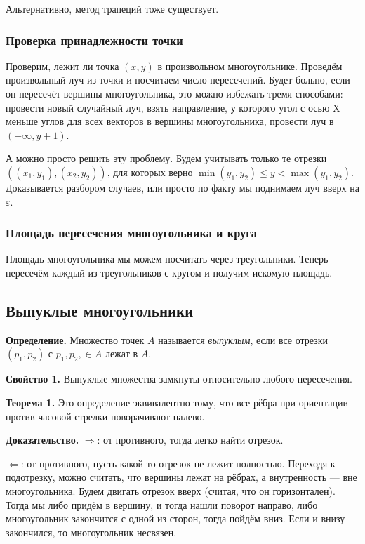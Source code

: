 Альтернативно, метод трапеций тоже существует.

\subsubsection{Проверка принадлежности точки}
Проверим, лежит ли точка $(x, y)$ в произвольном многоугольнике.
Проведём произвольный луч из точки и посчитаем число пересечений.
Будет больно, если он пересечёт вершины многоугольника, это можно избежать тремя способами: провести новый случайный луч, взять направление, у которого угол с осью X меньше углов для всех векторов в вершины многоугольника, провести луч в $(+\infty, y + 1)$.

А можно просто решить эту проблему. Будем учитывать только те отрезки $((x_1, y_1), (x_2, y_2))$, для которых верно $\min(y_1, y_2) \le y < \max(y_1, y_2)$.
Доказывается разбором случаев, или просто по факту мы поднимаем луч вверх на $\varepsilon$.

\subsubsection{Площадь пересечения многоугольника и круга}
Площадь многоугольника мы можем посчитать через треугольники.
Теперь пересечём каждый из треугольников с кругом и получим искомую площадь.

\subsection{Выпуклые многоугольники}
\textbf{Определение.} Множество точек $A$ называется \textit{выпуклым}, если все отрезки $(p_1, p_2)$ с $p_1, p_2, \in A$ лежат в $A$.

\textbf{Свойство 1.} Выпуклые множества замкнуты относительно любого пересечения.

\textbf{Теорема 1.} Это определение эквивалентно тому, что все рёбра при ориентации против часовой стрелки поворачивают налево.

\textbf{Доказательство.} $\Rightarrow$: от противного, тогда легко найти отрезок.

$\Leftarrow$: от противного, пусть какой-то отрезок не лежит полностью.
Переходя к подотрезку, можно считать, что вершины лежат на рёбрах, а внутренность --- вне многоугольника.
Будем двигать отрезок вверх (считая, что он горизонтален).
Тогда мы либо придём в вершину, и тогда нашли поворот направо, либо многоугольник закончится с одной из сторон, тогда пойдём вниз.
Если и внизу закончился, то многоугольник несвязен.

